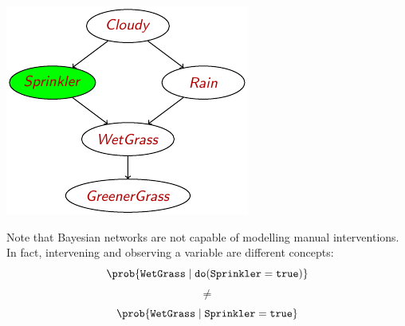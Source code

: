 \begin{description}
\begin{example}
            \begin{minipage}{.3\linewidth}
                \centering
                \includegraphics[width=\linewidth]{img/_do_operator_example2.pdf}
            \end{minipage}
            \begin{minipage}{.65\linewidth}
                Note that Bayesian networks are not capable of modelling manual interventions.
                In fact, intervening and observing a variable are different concepts:
                \[ \prob{\texttt{WetGrass} \mid \texttt{do}(\texttt{Sprinkler} = \texttt{true})} \]
                \[ \neq \]
                \[ \prob{\texttt{WetGrass} \mid \texttt{Sprinkler} = \texttt{true}} \]
            \end{minipage}
        \end{example}
\end{description}